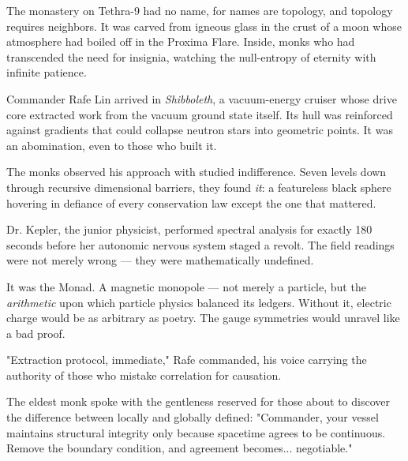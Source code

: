 \begin{tcolorbox}[colback=gray!5,colframe=gray!40,boxrule=0.5pt,arc=3pt,boxsep=10pt,left=8pt,right=8pt,top=8pt,bottom=8pt]

The monastery on Tethra-9 had no name, for names are topology, and topology requires neighbors. It was carved from igneous glass in the crust of a moon whose atmosphere had boiled off in the Proxima Flare. Inside, monks who had transcended the need for insignia, watching the null-entropy of eternity with infinite patience.

\medskip

Commander Rafe Lin arrived in \emph{Shibboleth}, a vacuum-energy cruiser whose drive core extracted work from the vacuum ground state itself. Its hull was reinforced against gradients that could collapse neutron stars into geometric points. It was an abomination, even to those who built it.

\medskip

The monks observed his approach with studied indifference. Seven levels down through recursive dimensional barriers, they found \emph{it}: a featureless black sphere hovering in defiance of every conservation law except the one that mattered.

\medskip

Dr. Kepler, the junior physicist, performed spectral analysis for exactly 180 seconds before her autonomic nervous system staged a revolt. The field readings were not merely wrong — they were mathematically undefined.

\medskip

It was the Monad. A magnetic monopole — not merely a particle, but the \emph{arithmetic} upon which particle physics balanced its ledgers. Without it, electric charge would be as arbitrary as poetry. The gauge symmetries would unravel like a bad proof.

\medskip

"Extraction protocol, immediate," Rafe commanded, his voice carrying the authority of those who mistake correlation for causation.

\medskip

The eldest monk spoke with the gentleness reserved for those about to discover the difference between locally and globally defined: "Commander, your vessel maintains structural integrity only because spacetime agrees to be continuous. Remove the boundary condition, and agreement becomes... negotiable."

\medskip


\end{tcolorbox}
